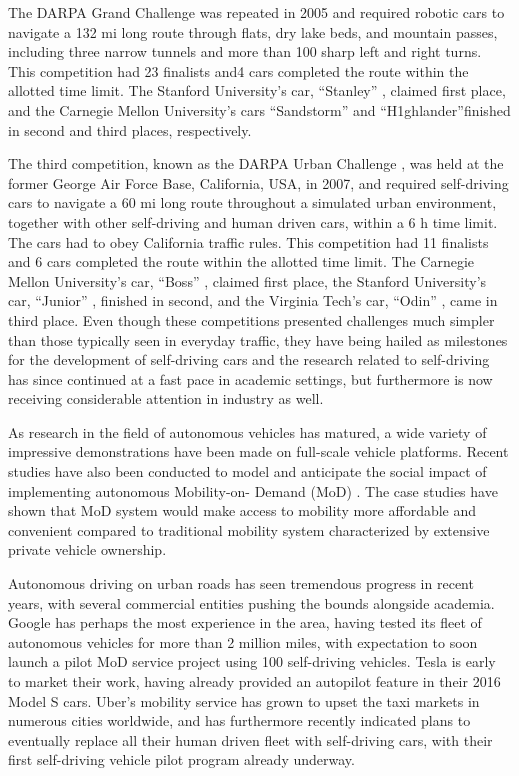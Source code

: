 The DARPA Grand Challenge \cite{BUE07} was repeated in 2005 and required robotic
cars to navigate a 132 mi long route through flats, dry lake beds, and mountain
passes, including three narrow tunnels and more than 100 sharp left and right
turns. This competition had 23 finalists and4 cars completed the route within
the allotted time limit. The Stanford University’s car, “Stanley” \cite{THR07},
claimed first place, and the Carnegie Mellon University’s cars “Sandstorm” and
“H1ghlander”finished in second and third places, respectively.

The third competition, known as the DARPA Urban Challenge \cite{BUE09}, was held
at the former George Air Force Base, California, USA, in 2007, and required
self-driving cars to navigate a 60 mi long route throughout a simulated urban
environment, together with other self-driving and human driven cars, within a 6
h time limit. The cars had to obey California traffic rules. This competition
had 11 finalists and 6 cars completed the route within the allotted time limit.
The Carnegie Mellon University’s car, “Boss” \cite{URM08}, claimed first place,
the Stanford University’s car, “Junior” \cite{MON08}, finished in second, and
the Virginia Tech’s car, “Odin” \cite{BAC08}, came in third place. Even though
these competitions presented challenges much simpler than those typically seen
in everyday traffic, they have being hailed as milestones for the development of
self-driving cars and the research related to self-driving has since continued
at a fast pace in academic settings, but furthermore is now receiving
considerable attention in industry as well.

As research in the field of autonomous vehicles has matured, a wide variety of
impressive demonstrations have been made on full-scale vehicle platforms. Recent
studies have also been conducted to model and anticipate the social impact of
implementing autonomous Mobility-on- Demand (MoD) \cite{zhang}. The case studies
have shown that MoD system would make access to mobility more affordable and
convenient compared to traditional mobility system characterized by extensive
private vehicle ownership.

Autonomous driving on urban roads has seen tremendous progress in recent years,
with several commercial entities pushing the bounds alongside academia. Google
has perhaps the most experience in the area, having tested its fleet of
autonomous vehicles for more than 2 million miles, with expectation to soon
launch a pilot MoD service project using 100 self-driving vehicles. Tesla is
early to market their work, having already provided an autopilot feature in
their 2016 Model S cars. Uber’s mobility service has grown to upset the taxi
markets in numerous cities worldwide, and has furthermore recently indicated
plans to eventually replace all their human driven fleet with self-driving cars,
with their first self-driving vehicle pilot program already underway.
 
